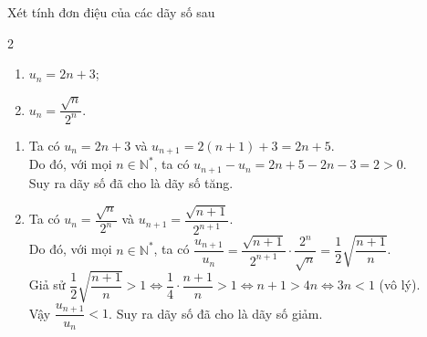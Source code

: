 \begin{vd}%
	Xét tính đơn điệu của các dãy số sau
	\begin{multicols}{2}
		\begin{enumerate}
			\item $u_n=2n+3$;
			\item $u_n=\dfrac{\sqrt{n}}{2^n}$.
		\end{enumerate}
	\end{multicols}
	\loigiai 
	{
	\begin{enumerate}
		\item Ta có $u_n=2n+3$ và $u_{n+1}=2(n+1)+3=2n+5$.\\
		Do đó, với mọi $n\in \mathbb{N}^*$, ta có $u_{n+1}-u_n=2n+5-2n-3=2>0$.\\
		Suy ra dãy số đã cho là dãy số tăng.
		\item Ta có $u_n=\dfrac{\sqrt{n}}{2^n}$ và $u_{n+1}=\dfrac{\sqrt{n+1}}{2^{n+1}}$.\\
		Do đó, với mọi $n\in \mathbb{N}^*$, ta có $\dfrac{u_{n+1}}{u_n}=\dfrac{\sqrt{n+1}}{2^{n+1}}\cdot \dfrac{2^n}{\sqrt{n}}=\dfrac{1}{2}\sqrt{\dfrac{n+1}{n}}$.\\
		Giả sử $\dfrac{1}{2}\sqrt{\dfrac{n+1}{n}}>1\Leftrightarrow\dfrac{1}{4}\cdot\dfrac{n+1}{n}>1\Leftrightarrow n+1>4n\Leftrightarrow 3n<1$ (vô lý).\\
		Vậy $\dfrac{u_{n+1}}{u_n}<1$. Suy ra dãy số đã cho là dãy số giảm.
	\end{enumerate}
	}
\end{vd}

